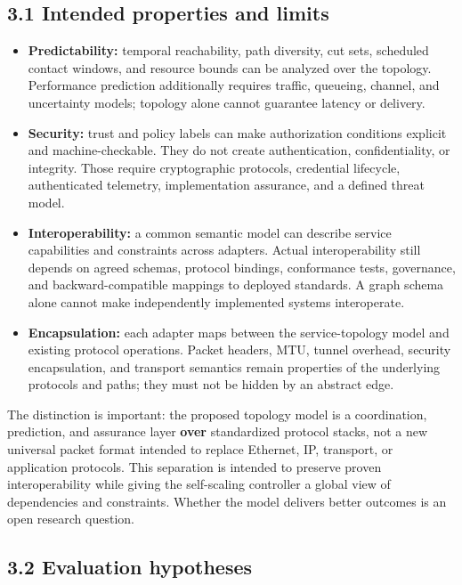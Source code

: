 \documentclass[
  american,
  11pt,
]{article}
\providecommand{\tightlist}{%
  \setlength{\itemsep}{0pt}\setlength{\parskip}{0pt}}
\begin{document}
\subsection{3.1 Intended properties and
limits}\label{intended-properties-and-limits}

\begin{itemize}
\tightlist
\item
  \textbf{Predictability:} temporal reachability, path diversity, cut
  sets, scheduled contact windows, and resource bounds can be analyzed
  over the topology. Performance prediction additionally requires
  traffic, queueing, channel, and uncertainty models; topology alone
  cannot guarantee latency or delivery.
\item
  \textbf{Security:} trust and policy labels can make authorization
  conditions explicit and machine-checkable. They do not create
  authentication, confidentiality, or integrity. Those require
  cryptographic protocols, credential lifecycle, authenticated
  telemetry, implementation assurance, and a defined threat model.
\item
  \textbf{Interoperability:} a common semantic model can describe
  service capabilities and constraints across adapters. Actual
  interoperability still depends on agreed schemas, protocol bindings,
  conformance tests, governance, and backward-compatible mappings to
  deployed standards. A graph schema alone cannot make independently
  implemented systems interoperate.
\item
  \textbf{Encapsulation:} each adapter maps between the service-topology
  model and existing protocol operations. Packet headers, MTU, tunnel
  overhead, security encapsulation, and transport semantics remain
  properties of the underlying protocols and paths; they must not be
  hidden by an abstract edge.
\end{itemize}

The distinction is important: the proposed topology model is a
coordination, prediction, and assurance layer \textbf{over} standardized
protocol stacks, not a new universal packet format intended to replace
Ethernet, IP, transport, or application protocols. This separation is
intended to preserve proven interoperability while giving the
self-scaling controller a global view of dependencies and constraints.
Whether the model delivers better outcomes is an open research question.

\subsection{3.2 Evaluation hypotheses}\label{evaluation-hypotheses}
\end{document}
